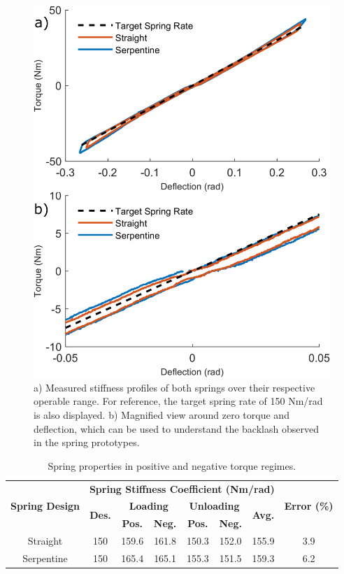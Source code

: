 \documentclass[letterpaper, 10 pt, conference]{ieeeconf} %
\begin{document}
\begin{figure}[b!]
    \centering
    \includegraphics[width=\columnwidth]{figs/spring_plots.png}
    \caption{a) Measured stiffness profiles of both springs over their respective operable range. For reference, the target spring rate of 150 Nm/rad is also displayed. b) Magnified view around zero torque and deflection, which can be used to understand the backlash observed in the spring prototypes.}
    \label{fig:lin_springrates}
\end{figure}

\begin{table}[t]
    \caption{Spring properties in positive and negative torque regimes.}
    \centering
    \begin{tabular}{ c c c c c c c c  }
    \hline
    \multirow{3}{3em}{\textbf{Spring Design}} & \multicolumn{6}{c}{\textbf{Spring Stiffness Coefficient (Nm/rad)}} & \multirow{3}{1.5em}{\centering\textbf{Error (\%)}}\\
    & \multirow{2}{*}{\textbf{Des.}} & \multicolumn{2}{c}{\textbf{Loading}} & \multicolumn{2}{c}{\textbf{Unloading}} & \multirow{2}{1.5em}{\textbf{Avg.}} & \\ 
    & & \textbf{Pos.} & \textbf{Neg.} & \textbf{Pos.} & \textbf{Neg.} & &\\ 
    \hline
    Straight & 150 & 159.6 & 161.8 & 150.3 & 152.0 & 155.9 & 3.9\\
    Serpentine & 150 & 165.4 & 165.1 & 155.3 & 151.5 & 159.3 & 6.2\\
    \hline
    \end{tabular}
    \label{table:linear_spring_rates}
\end{table}
\end{document}
